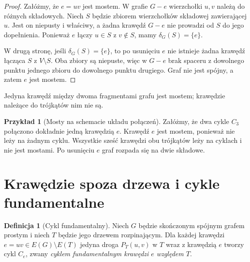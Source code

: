 \documentclass[11pt,a4paper]{report}
\numberwithin{equation}{section}
\theoremstyle{plain}
\theoremstyle{definition}
\newtheorem{definicja}[twierdzenie]{Definicja}
\newtheorem{przyklad}[twierdzenie]{Przykład}
\theoremstyle{remark}
\begin{document}
\begin{proof}
Załóżmy, że $e=uv$ jest mostem. W grafie
$G-e$ wierzchołki $u,v$ należą do różnych
składowych. Niech $S$ będzie zbiorem
wierzchołków składowej zawierającej $u$.
Jest on niepusty i właściwy, a żadna krawędź
$G-e$ nie prowadzi od $S$ do jego dopełnienia.
Ponieważ $e$ łączy $u\in S$ z $v\notin S$,
mamy $\delta_G(S)=\{e\}$.

W drugą stronę, jeśli $\delta_G(S)=\{e\}$,
to po usunięciu $e$ nie istnieje żadna
krawędź łącząca $S$ z $V\setminus S$.
Oba zbiory są niepuste, więc w $G-e$
brak spaceru z dowolnego punktu jednego
zbioru do dowolnego punktu drugiego.
Graf nie jest spójny, a zatem $e$ jest mostem.
\end{proof}

\begin{center}

{\footnotesize Jedyna krawędź między dwoma fragmentami
grafu jest mostem; krawędzie należące do trójkątów nim nie są.}
\end{center}

\begin{przyklad}[Mosty na schemacie układu połączeń]
Załóżmy, że dwa cykle $C_3$ połączono dokładnie jedną
krawędzią $e$. Krawędź $e$ jest mostem, ponieważ
nie leży na żadnym cyklu. Wszystkie sześć krawędzi
obu trójkątów leży na cyklach i nie jest mostami.
Po usunięciu $e$ graf rozpada się na dwie składowe.
\end{przyklad}

\section{Krawędzie spoza drzewa i cykle fundamentalne}
\label{sec:tg-fundamentalne}

\begin{definicja}[Cykl fundamentalny]
Niech $G$ będzie skończonym spójnym grafem
prostym i niech $T$ będzie jego drzewem
rozpinającym. Dla każdej krawędzi
$e=uv\in E(G)\setminus E(T)$ jedyna droga
$P_T(u,v)$ w $T$ wraz z krawędzią $e$
tworzy cykl $C_e$, zwany \emph{cyklem
fundamentalnym krawędzi $e$ względem $T$}.
\end{definicja}
\end{document}
